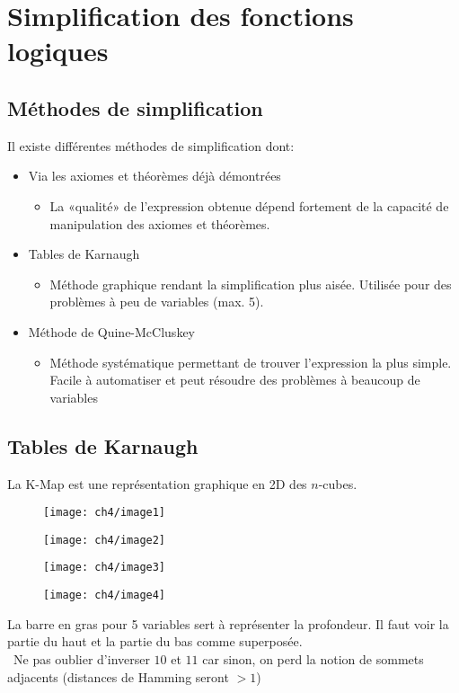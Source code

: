 \chapter{Simplification des fonctions logiques}
\section{Méthodes de simplification}
Il existe différentes méthodes de simplification dont:
\begin{itemize}
	\item Via les axiomes et théorèmes déjà démontrées
	\begin{itemize}
		\item La «qualité» de l'expression obtenue dépend fortement de la capacité de manipulation des axiomes et théorèmes.
	\end{itemize}
	\item Tables de Karnaugh
	\begin{itemize}
		\item Méthode graphique rendant la simplification plus aisée. Utilisée pour des problèmes à peu de variables (max. 5).
	\end{itemize}
	\item Méthode de Quine-McCluskey
	\begin{itemize}
		\item Méthode systématique permettant de trouver l'expression la plus simple. Facile à automatiser et peut résoudre des problèmes à beaucoup de variables
	\end{itemize}
\end{itemize}
\section{Tables de Karnaugh}
La K-Map est une représentation graphique en 2D des $n$-cubes.
\begin{figure}[H]
	\begin{minipage}{0.5\textwidth}
		\centering
		\texttt{[image: ch4/image1]}
	\end{minipage}
	\begin{minipage}{0.5\textwidth}
		\centering
		\texttt{[image: ch4/image2]}
	\end{minipage}\vspace{1cm}
	\begin{minipage}{0.5\textwidth}
		\centering
		\texttt{[image: ch4/image3]}
	\end{minipage}
	\begin{minipage}{0.5\textwidth}
		\centering
		\texttt{[image: ch4/image4]}
	\end{minipage}
\end{figure}
La barre en gras pour 5 variables sert à représenter la profondeur. Il faut voir la partie du haut et la partie du bas comme superposée.\\
\danger\ Ne pas oublier d'inverser $10$ et $11$ car sinon, on perd la notion de sommets adjacents (distances de Hamming seront $>1$)
